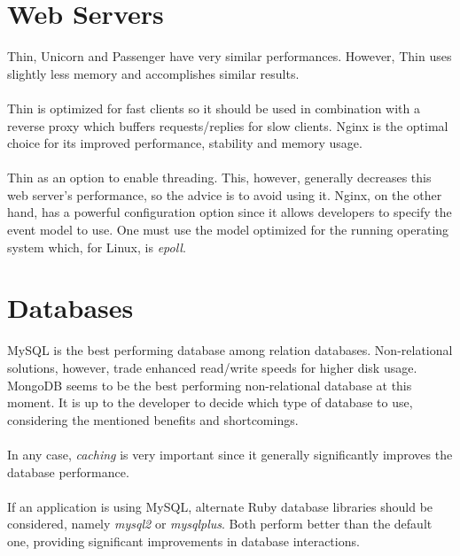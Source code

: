 \section{Web Servers}
Thin, Unicorn and Passenger have very similar performances. However, Thin uses slightly less memory and accomplishes similar results.\\\\
Thin is optimized for fast clients so it should be used in combination with a reverse proxy which buffers requests/replies for slow clients. Nginx is the optimal choice for its improved performance, stability and memory usage.\\\\
Thin as an option to enable threading. This, however, generally decreases this web server's performance, so the advice is to avoid using it. Nginx, on the other hand, has a powerful configuration option since it allows developers to specify the event model to use. One must use the model optimized for the running operating system which, for Linux, is \textit{epoll}.

\section{Databases}
MySQL is the best performing database among relation databases. Non-relational solutions, however, trade enhanced read/write speeds for higher disk usage. MongoDB seems to be the best performing non-relational database at this moment. It is up to the developer to decide which type of database to use, considering the mentioned benefits and shortcomings.\\\\
In any case, \textit{caching} is very important since it generally significantly improves the database performance.\\\\
If an application is using MySQL, alternate Ruby database libraries should be considered, namely \textit{mysql2} or \textit{mysqlplus}. Both perform better than the default one, providing significant improvements in database interactions.

